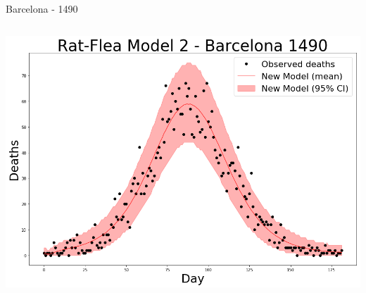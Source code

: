 \documentclass[t,10pt,fleqn]{beamer}
\begin{document}
\begin{frame}{Barcelona - 1490}
\begin{columns}
		\includegraphics[width=\linewidth]{rats2/barcelona-40-30-22-15x10}

	\end{columns}
\end{frame}
\end{document}
